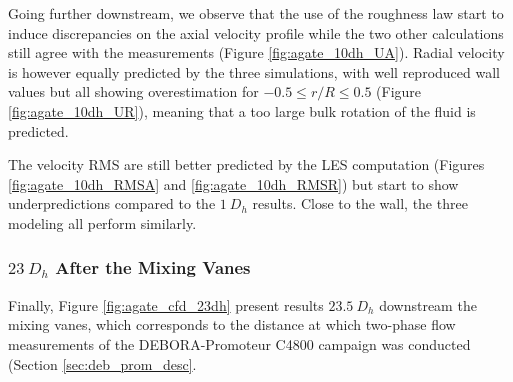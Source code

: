 Going further downstream, we observe that the use of the roughness law start to induce discrepancies on the axial velocity profile while the two other calculations still agree with the measurements (Figure \ref{fig:agate_10dh_UA}). Radial velocity is however equally predicted by the three simulations, with well reproduced wall values but all showing overestimation for $-0.5 \leq r/R \leq 0.5$ (Figure \ref{fig:agate_10dh_UR}), meaning that a too large bulk rotation of the fluid is predicted. 

\npar

The velocity RMS are still better predicted by the LES computation (Figures \ref{fig:agate_10dh_RMSA} and \ref{fig:agate_10dh_RMSR}) but start to show underpredictions compared to the $1\ D_{h}$ results. Close to the wall, the three modeling all perform similarly.


\subsubsection{$23\ D_{h}$ After the Mixing Vanes}

Finally, Figure \ref{fig:agate_cfd_23dh} present results $23.5\ D_{h}$ downstream the mixing vanes, which corresponds to the distance at which two-phase flow measurements of the DEBORA-Promoteur C4800 campaign was conducted (Section \ref{sec:deb_prom_desc}.


